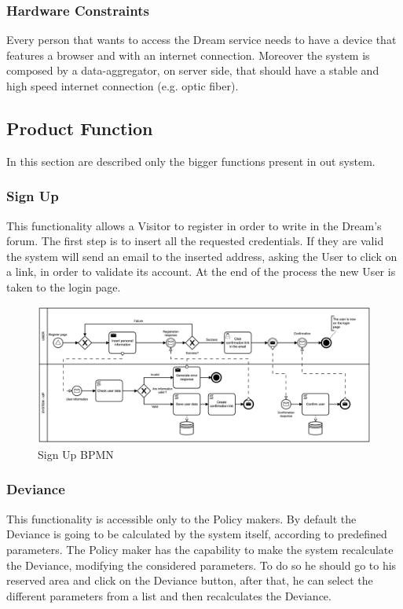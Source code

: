 \subsubsection{Hardware Constraints} \label{sec:hardware_constraint}
Every person that wants to access the Dream service needs to have a device that features a browser and with an internet connection. Moreover the system is composed by a data-aggregator, on server side, that should have a stable and high speed internet connection (e.g. optic fiber).

\subsection{Product Function} \label{sec:product-function}
In this section are described only the bigger functions present in out system.
\subsubsection{Sign Up}
This functionality allows a Visitor to register in order to write in the Dream’s forum.
The first step is to insert all the requested credentials. If they are valid the system will send an email to the inserted address, asking the User to click on a link, in order to validate its account. At the end of the process the new User is taken to the login page.
\begin{figure}[h!]
    \centering
    \includegraphics[scale=0.10]{images/bpmn/signup_bpmn.png}
    \caption{Sign Up BPMN}
    \label{fig:bpmn_signup}
\end{figure}
\FloatBarrier
\subsubsection{Deviance}
This functionality is accessible only to the Policy makers. By default the Deviance is going to be calculated by the system itself, according to predefined parameters. The Policy maker has the capability to make the system recalculate the Deviance, modifying the considered parameters. To do so he should go to his reserved area and click on the Deviance button, after that, he can select the different parameters from a list and then recalculates the Deviance.

